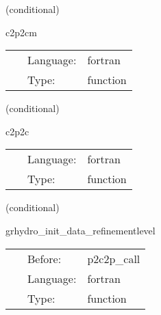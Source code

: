 \vspace{5mm}

   (conditional) 

\hspace{5mm} c2p2cm 

\hspace{5mm}{\it testing conservative to primitive to conservative - mhd version } 


\hspace{5mm}

 \begin{tabular*}{160mm}{cll} 
~ & Language:  & fortran \\ 
~ & Type:  & function \\ 
\end{tabular*} 


\vspace{5mm}

   (conditional) 

\hspace{5mm} c2p2c 

\hspace{5mm}{\it testing conservative to primitive to conservative } 


\hspace{5mm}

 \begin{tabular*}{160mm}{cll} 
~ & Language:  & fortran \\ 
~ & Type:  & function \\ 
\end{tabular*} 


\vspace{5mm}

   (conditional) 

\hspace{5mm} grhydro\_init\_data\_refinementlevel 

\hspace{5mm}{\it calculate current refinement level } 


\hspace{5mm}

 \begin{tabular*}{160mm}{cll} 
~ & Before:  & p2c2p\_call \\ 
~ & Language:  & fortran \\ 
~ & Type:  & function \\ 
\end{tabular*} 


